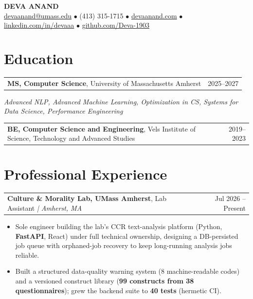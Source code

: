 \documentclass[letterpaper,11pt]{article}
\makeatletter
\newcommand{\eduItem}[3]{%
  \begin{tabular*}{\textwidth}{@{}l@{\extracolsep{\fill}}r@{}}
    \textbf{#1}, #2 & #3 \\
  \end{tabular*}\par
}
\newcommand{\expItem}[4]{%
  \vspace{2pt}
  \begin{tabular*}{\textwidth}{@{}l@{\extracolsep{\fill}}r@{}}
    \textbf{#1}, #2 \textit{| #3} & #4 \\
  \end{tabular*}\par\vspace{-3pt}
}
\makeatother
\begin{document}
\begin{center}
    {\fontsize{18}{20}\selectfont\bfseries DEVA ANAND}\\ \vspace{3pt}
    {\small
    \href{mailto:devaanand@umass.edu}{devaanand@umass.edu}
    \enspace$\bullet$\enspace
    (413) 315-1715
    \enspace$\bullet$\enspace
    \href{https://devaanand.com}{devaanand.com}
    \enspace$\bullet$\enspace
    \href{https://linkedin.com/in/devaaa/}{linkedin.com/in/devaaa}
    \enspace$\bullet$\enspace
    \href{https://github.com/Deva-1903}{github.com/Deva-1903}}
\end{center}
\vspace{-8pt}

\section{Education}
\eduItem{MS, Computer Science}{University of Massachusetts Amherst}{2025--2027}
{\small\textit{Advanced NLP, Advanced Machine Learning, Optimization in CS, Systems for Data Science, Performance Engineering}}\par
\vspace{3pt}
\eduItem{BE, Computer Science and Engineering}{Vels Institute of Science, Technology and Advanced Studies}{2019--2023}

\section{Professional Experience}

\expItem{Culture \& Morality Lab, UMass Amherst}{Lab Assistant}{Amherst, MA}{Jul 2026 -- Present}
\begin{itemize}
  \item Sole engineer building the lab's CCR text-analysis platform (Python, \textbf{FastAPI}, React) under full technical ownership, designing a DB-persisted job queue with orphaned-job recovery to keep long-running analysis jobs reliable.
  \item Built a structured data-quality warning system (8 machine-readable codes) and a versioned construct library (\textbf{99 constructs from 38 questionnaires}); grew the backend suite to \textbf{40 tests} (hermetic CI).
\end{itemize}
\end{document}

